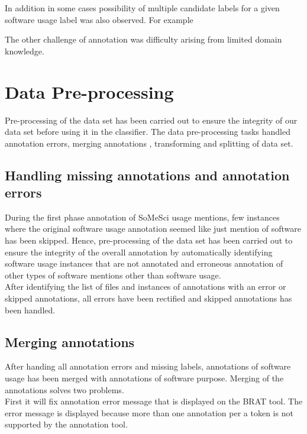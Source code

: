 In addition in some cases possibility of multiple candidate labels for a given software usage label was also observed. For example  

The other challenge of annotation was difficulty arising from limited domain knowledge. 

\section{Data Pre-processing}
\label{sec:dataset:preprocessing}
Pre-processing of the data set has been carried out to ensure the integrity of our data set before using it in the classifier. The data pre-processing tasks handled annotation errors, merging annotations , transforming and splitting of data set. 

\subsection{Handling missing annotations and annotation errors }
\label{subsec:dataset:preprocessing:handlingerrors}

During the first phase  annotation of SoMeSci usage mentions, few instances where  the original software usage annotation seemed like just mention of software has been skipped. Hence, pre-processing of the data set has been carried out to ensure the integrity of the overall annotation by automatically identifying software usage instances that are not annotated and erroneous annotation of other types of software mentions other than software usage. \\

After identifying the list of files and instances of annotations with an error or skipped annotations, all errors have been rectified and skipped annotations has been handled.


\subsection{Merging annotations}
\label{subsec:dataset:preprocessing:Merging}


After handing all annotation errors and missing labels, annotations of software usage has been merged with annotations of software purpose. Merging of the annotations solves two problems. \\

First it will fix annotation error message that is displayed on the BRAT tool. The error message is displayed because more than one annotation per a token is not supported by the annotation tool. \\

